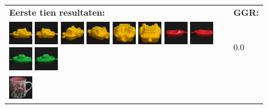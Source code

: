 \begin{figure}[tbp]
\begin{center}
\begin{tabular}{m{11cm} | m{3cm} |}
\textbf{Eerste tien resultaten:} & \textbf{GGR:} \\
\vspace{4pt}
\includegraphics[width=1cm]{coil/beeld-12.eps}
\includegraphics[width=1cm]{coil/beeld-13.eps}
\includegraphics[width=1cm]{coil/beeld-15.eps}
\includegraphics[width=1cm]{coil/beeld-16.eps}
\includegraphics[width=1cm]{coil/beeld-17.eps}
\includegraphics[width=1cm]{coil/beeld-14.eps}
\includegraphics[width=1cm]{coil/beeld-19.eps}
\includegraphics[width=1cm]{coil/beeld-18.eps}
\includegraphics[width=1cm]{coil/beeld-54.eps}
\includegraphics[width=1cm]{coil/beeld-55.eps}
& {\scriptsize 0.0}
\\
\includegraphics[width=1cm]{coil/beeld-6.eps}

\end{tabular}
\end{center}
\end{figure}
